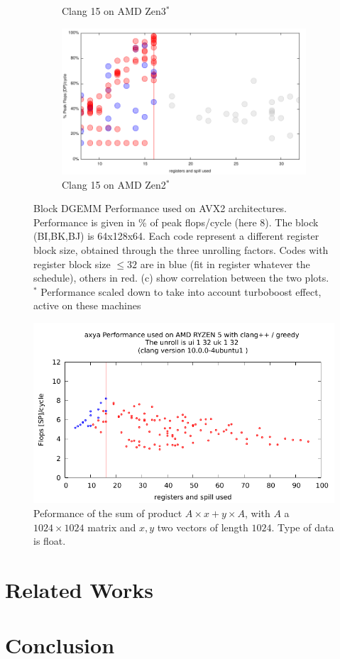 \documentclass{article}
\begin{document}
\begin{figure}[h!]
\begin{subfigure}[h]{0.45\textwidth}
  \caption{Clang 15 on AMD Zen3$^*$}
  \end{subfigure}
  \begin{subfigure}[h]{0.45\textwidth}  
\includegraphics[width=\textwidth]{../benches/gemm/zen3-64x256x64/greedy-zen2.pdf}
  \caption{Clang 15 on AMD Zen2$^*$}
  \end{subfigure}
  \caption{Block DGEMM Performance used on AVX2 architectures. Performance is given in \% of peak flops/cycle (here 8). The block (BI,BK,BJ) is 64x128x64. Each code represent a different register block size, obtained through the three unrolling factors. Codes with register block size $\leq 32$ are in blue (fit in register whatever the schedule), others in red. (c) show correlation between the two plots. $^*$ Performance scaled down to take into account turboboost effect, active on these machines\label{fig:avx2}}
\end{figure}



\begin{figure}[h!]

  \includegraphics[width=\textwidth]{../autobench/datas/axya/axya_ui_1_32_uk_1_32.pdf}
  \caption{Peformance of the sum of product $A\times x+y\times A$, with $A$ a $1024\times1024$ matrix and $x,y$ two vectors of length $1024$. Type of data is float.}
\end{figure}


\section{Related Works}
\section{Conclusion}
\label{sec:conclusion}


\end{document}
